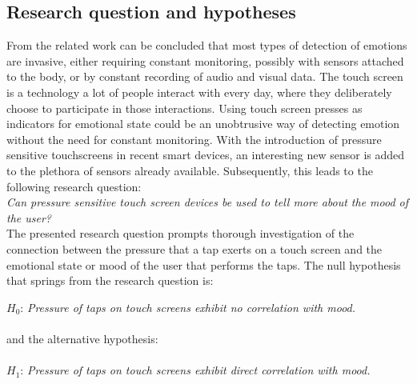 \documentclass{sigchi}
\begin{document}

\subsection{Research question and hypotheses}
From the related work can be concluded that most types of detection of emotions are invasive, either requiring constant monitoring, possibly with sensors attached to the body, or by constant recording of audio and visual data. The touch screen is a technology a lot of people interact with every day, where they deliberately choose to participate in those interactions. Using touch screen presses as indicators for emotional state could be an unobtrusive way of detecting emotion without the need for constant monitoring. With the introduction of pressure sensitive touchscreens in recent smart devices, an interesting new sensor is added to the plethora of sensors already available. Subsequently, this leads to the following research question:\\

\textit{Can pressure sensitive touch screen devices be used to tell more about the mood of the user?}\\

The presented research question prompts thorough investigation of the connection between the pressure that a tap exerts on a touch screen and the emotional state or mood of the user that performs the taps. The null hypothesis that springs from the  research question is:

$H_0$: \textit{Pressure of taps on touch screens exhibit no correlation with mood.}
\\\\and the alternative hypothesis:\\\\
$H_1$: \textit{Pressure of taps on touch screens exhibit direct correlation with mood.}





\end{document}
